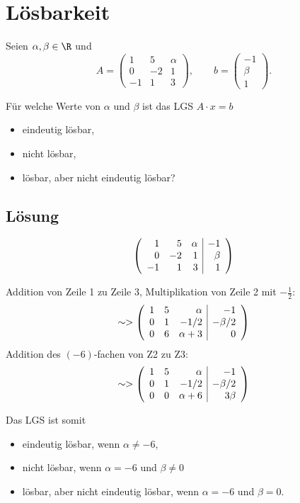 \newpage
\section{L\"osbarkeit}

Seien $\alpha,\beta \in \R$ und
$$
	A =
	\begin{pmatrix}
		1	&5	&\alpha	\\
		0	&-2	&1	\\
		-1	&1	&3
	\end{pmatrix},
	\qquad
	b =
	\begin{pmatrix}
		-1	\\
		\beta	\\
		1
	\end{pmatrix}.
$$

F\"ur welche Werte von $\alpha$ und $\beta$ ist das LGS $A\cdot x = b$
\begin{itemize}
	\item eindeutig l\"osbar,
	\item nicht l\"osbar,
	\item l\"osbar, aber nicht eindeutig l\"osbar?
\end{itemize}

\subsection*{L\"osung}

$$
	\left(
		\begin{array}{rrr | r}
			1	&5	&\alpha	&-1\\
			0	&-2	&1	&\beta\\
			-1	&1	&3	&1
		\end{array}
	\right)
$$

Addition von Zeile 1 zu Zeile 3, Multiplikation von Zeile 2 mit $-\frac{1}{2}$:
$$
	\sim>
	\left(
		\begin{array}{rrr | r}
			1	&5	&\alpha		&-1\\
			0	&1	&-1/2	&-\beta/2\\
			0	&6	&\alpha+3	&0
		\end{array}
	\right)
$$
Addition des $(-6)$-fachen von Z2 zu Z3:
$$
	\sim>
	\left(
		\begin{array}{rrr | r}
			1	&5	&\alpha		&-1\\
			0	&1	&-1/2	&-\beta/2\\
			0	&0	&\alpha+6	&3\beta
		\end{array}
	\right)
$$

Das LGS ist somit
\begin{itemize}
	\item eindeutig l\"osbar, wenn $\alpha\neq -6$,
	\item nicht l\"osbar, wenn $\alpha=-6$ und $\beta\neq 0$
	\item l\"osbar, aber nicht eindeutig l\"osbar, wenn $\alpha=-6$ und $\beta=0$.
\end{itemize}



